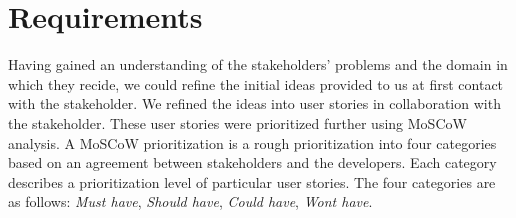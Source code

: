 
\section{Requirements}\label{sec:requirement_elicitation}
Having gained an understanding of the stakeholders' problems and the domain in which they recide, we could refine the initial ideas provided to us at first contact with the stakeholder.
We refined the ideas into user stories in collaboration with the stakeholder.%
These user stories were prioritized further using MoSCoW analysis\cite{DEBbook}.
A MoSCoW prioritization is a rough prioritization into four categories based on an agreement between stakeholders and the developers.
Each category describes a prioritization level of particular user stories. The four categories are as follows: \textit{Must have}, \textit{Should have}, \textit{Could have}, \textit{Wont have}.

